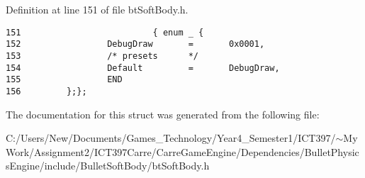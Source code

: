 Definition at line 151 of file btSoftBody.h.

\begin{Code}\begin{verbatim}151                          { enum _ {
152                 DebugDraw       =       0x0001, 
153                 /* presets      */ 
154                 Default         =       DebugDraw,
155                 END
156         };};
\end{verbatim}
\end{Code}




The documentation for this struct was generated from the following file:\begin{CompactItemize}
\item 
C:/Users/New/Documents/Games\_\-Technology/Year4\_\-Semester1/ICT397/$\sim$My Work/Assignment2/ICT397Carre/CarreGameEngine/Dependencies/BulletPhysicsEngine/include/BulletSoftBody/btSoftBody.h\end{CompactItemize}
